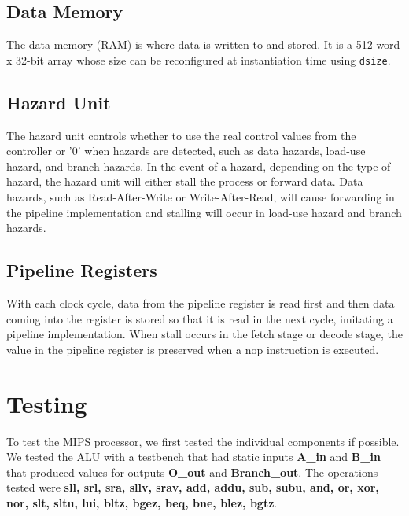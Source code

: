 \documentclass{article}
\begin{document}
	\subsection{Data Memory}
	The data memory (RAM) is where data is written to and stored. It is a 512-word x 32-bit array whose size can be reconfigured at instantiation time using \texttt{dsize}.
		
	\subsection{Hazard Unit}
	The hazard unit controls whether to use the real control values from the controller or '0' when hazards are detected, such as data hazards, load-use hazard, and branch hazards. In the event of a hazard, depending on the type of hazard, the hazard unit will either stall the process or forward data. Data hazards, such as Read-After-Write or Write-After-Read, will cause forwarding in the pipeline implementation and stalling will occur in load-use hazard and branch hazards.
		
	\subsection{Pipeline Registers}
	With each clock cycle, data from the pipeline register is read first and then data coming into the register is stored so that it is read in the next cycle, imitating a pipeline implementation. When stall occurs in the fetch stage or decode stage, the value in the pipeline register is preserved when a nop instruction is executed. 
		
\section{Testing}
To test the MIPS processor, we first tested the individual components if possible. We tested the ALU with a testbench that had static inputs \textbf{A\_in} and \textbf{B\_in} that produced values for outputs \textbf{O\_out} and \textbf{Branch\_out}. The operations tested were \textbf{sll, srl, sra, sllv, srav, add, addu, sub, subu, and, or,  xor, nor, slt, sltu, lui, bltz, bgez, beq, bne, blez, bgtz}. 
\end{document}
